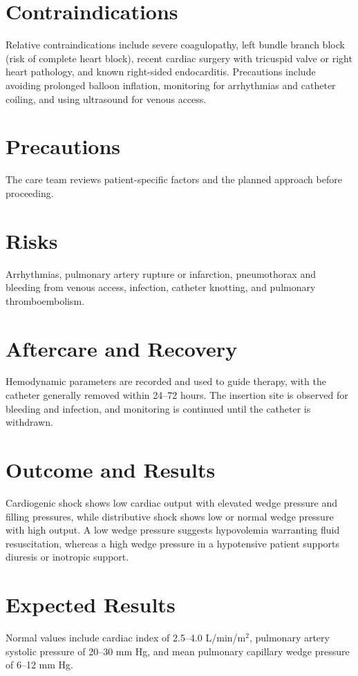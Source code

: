 \section*{Contraindications}
Relative contraindications include severe coagulopathy, left bundle branch block (risk of complete heart block), recent cardiac surgery with tricuspid valve or right heart pathology, and known right-sided endocarditis. Precautions include avoiding prolonged balloon inflation, monitoring for arrhythmias and catheter coiling, and using ultrasound for venous access.

\section*{Precautions}
The care team reviews patient-specific factors and the planned approach before proceeding.

\section*{Risks}
Arrhythmias, pulmonary artery rupture or infarction, pneumothorax and bleeding from venous access, infection, catheter knotting, and pulmonary thromboembolism.

\section*{Aftercare and Recovery}
Hemodynamic parameters are recorded and used to guide therapy, with the catheter generally removed within 24--72 hours. The insertion site is observed for bleeding and infection, and monitoring is continued until the catheter is withdrawn.

\section*{Outcome and Results}
Cardiogenic shock shows low cardiac output with elevated wedge pressure and filling pressures, while distributive shock shows low or normal wedge pressure with high output. A low wedge pressure suggests hypovolemia warranting fluid resuscitation, whereas a high wedge pressure in a hypotensive patient supports diuresis or inotropic support.

\section*{Expected Results}
Normal values include cardiac index of 2.5--4.0 L/min/m$^2$, pulmonary artery systolic pressure of 20--30 mm Hg, and mean pulmonary capillary wedge pressure of 6--12 mm Hg.

